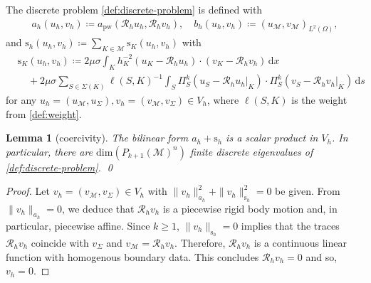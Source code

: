 \documentclass[a4paper]{amsart}
\numberwithin{equation}{section}
\renewcommand{\d}[1]{\,\mathrm{d}#1}
\newcommand{\Mcal}{\mathcal{M}}
\newcommand{\s}{\mathrm{s}}
\newcommand{\pw}{\mathrm{pw}}
\newtheorem{lemma}[theorem]{Lemma}
\theoremstyle{remark}
\theoremstyle{definition}
\theoremstyle{assumptionnoperiod}
\begin{document}
The discrete problem \eqref{def:discrete-problem} is defined with
\begin{align*}
	a_h(u_h,v_h) \coloneqq a_\pw(\mathcal{R}_h u_h,\mathcal{R}_h v_h), \quad b_h(u_h, v_h) \coloneqq (u_\Mcal, v_\Mcal)_{L^2(\Omega)},
\end{align*}
and $\s_h(u_h, v_h) \coloneqq \sum_{K \in \mathcal{M}} \s_K(u_h,v_h)$ with
\begin{align*}
	&\s_K(u_h, v_h) \coloneqq 2\mu\sigma \int_K h_K^{-2} (u_K - \mathcal{R}_h u_h) \cdot (v_K - \mathcal{R}_h v_h) \d{x}\nonumber\\
	&\quad + 2\mu\sigma \sum_{S \in \Sigma(K)} \ell(S,K)^{-1} \int_S \Pi_S^k(u_S - \mathcal{R}_h u_h|_K) \cdot \Pi_S^k (v_S - \mathcal{R}_h v_h|_K) \d{s}
\end{align*}
for any $u_h = (u_\Mcal, u_\Sigma), v_h = (v_\Mcal, v_\Sigma) \in V_h$, where $\ell(S,K)$ is the weight from \eqref{def:weight}.

\begin{lemma}[coercivity]\label{lem:coercivity-le}
	The bilinear form $a_h + \s_h$ is a scalar product in $V_h$.
	In particular, there are $\mathrm{dim}(P_{k+1}(\Mcal)^n)$ finite discrete eigenvalues of \eqref{def:discrete-problem}. \qed
\end{lemma}

\begin{proof}
	Let $v_h = (v_\Mcal, v_\Sigma) \in V_h$ with $\|v_h\|_{a_h}^2 + \|v_h\|_{\s_h}^2 = 0$ be given. From $\|v_h\|_{a_h} = 0$, we deduce that $\mathcal{R}_h v_h$ is a piecewise rigid body motion and, in particular, piecewise affine.
	Since $k \geq 1$, $\|v_h\|_{\s_h} = 0$ implies that the traces $\mathcal{R}_h v_h$ coincide with $v_\Sigma$ and $v_\Mcal = \mathcal{R}_h v_h$. Therefore, $\mathcal{R}_h v_h$ is a continuous linear function with homogenous boundary data. This concludes $\mathcal{R}_h v_h = 0$ and so, $v_h = 0$.
\end{proof}
\end{document}
